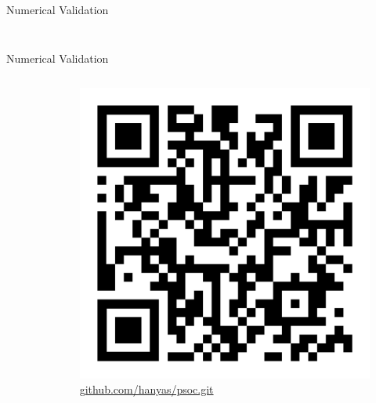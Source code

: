 \documentclass[10pt, aspectratio=1610]{beamer}
\begin{document}
    \begin{frame}{Numerical Validation}
      \begin{columns}
        \begin{column}{0.5\textwidth}
          \begin{figure}[htbp]
            \centering
            
          \end{figure}
        \end{column}
        \begin{column}{0.5\textwidth}
          \begin{figure}[htbp]
            \centering
            
          \end{figure}
        \end{column}
      \end{columns}
    \end{frame}

    \begin{frame}{Numerical Validation}
      \begin{columns}
        \begin{column}{0.5\textwidth}
          \begin{figure}[htbp]
            \centering
            
          \end{figure}
        \end{column}
        \begin{column}{0.5\textwidth}
          \begin{figure}[htbp]
            \centering
            \includegraphics[scale=0.1]{figures/psoc_qr.png}
            \caption{\url{github.com/hanyas/psoc.git}}
          \end{figure}
        \end{column}
      \end{columns}
    \end{frame}
\end{document}
